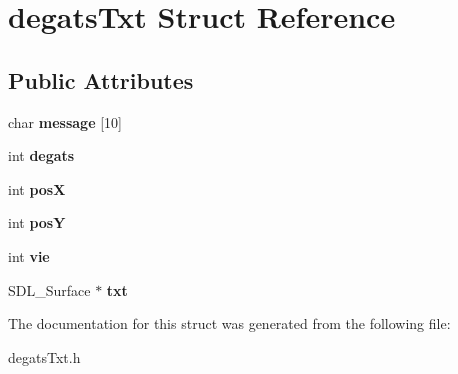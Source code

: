 \hypertarget{structdegatsTxt}{}\section{degats\+Txt Struct Reference}
\label{structdegatsTxt}
\subsection*{Public Attributes}
\begin{DoxyCompactItemize}
\item 
\mbox{\label{structdegatsTxt_a3599dbe512c5498d18cad73d232361ce}} 
char {\bfseries message} \mbox{[}10\mbox{]}
\item 
\mbox{\label{structdegatsTxt_a4cdac28ba9a351c8ff3bac2cd685b5a3}} 
int {\bfseries degats}
\item 
\mbox{\label{structdegatsTxt_a1832703d78c7079d15008482dd7c2050}} 
int {\bfseries posX}
\item 
\mbox{\label{structdegatsTxt_a6492362f6425ef32c1ad33668550ed90}} 
int {\bfseries posY}
\item 
\mbox{\label{structdegatsTxt_a7576c3c88fa65f274f82bc054e1d50ad}} 
int {\bfseries vie}
\item 
\mbox{\label{structdegatsTxt_a951d6abd23208540052924500fce4f2b}} 
S\+D\+L\+\_\+\+Surface $\ast$ {\bfseries txt}
\end{DoxyCompactItemize}


The documentation for this struct was generated from the following file\+:\begin{DoxyCompactItemize}
\item 
degats\+Txt.\+h\end{DoxyCompactItemize}
